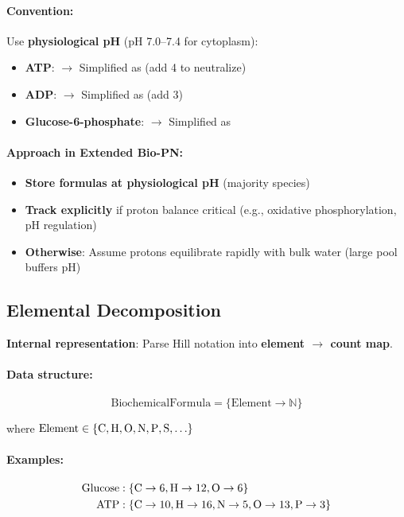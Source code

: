 \paragraph{Convention:} Use \textbf{physiological pH} (pH 7.0--7.4 for cytoplasm):
\begin{itemize}
    \item \textbf{ATP}:  $\to$ Simplified as  (add 4 to neutralize)
    \item \textbf{ADP}:  $\to$ Simplified as  (add 3)
    \item \textbf{Glucose-6-phosphate}:  $\to$ Simplified as 
\end{itemize}

\paragraph{Approach in Extended Bio-PN:}
\begin{itemize}
    \item \textbf{Store formulas at physiological pH} (majority species)
    \item \textbf{Track  explicitly} if proton balance critical (e.g., oxidative phosphorylation, pH regulation)
    \item \textbf{Otherwise}: Assume protons equilibrate rapidly with bulk water (large  pool buffers pH)
\end{itemize}

\subsection{Elemental Decomposition}
\label{subsec:elemental-decomposition}

\textbf{Internal representation}: Parse Hill notation into \textbf{element $\to$ count map}.

\paragraph{Data structure:}
\begin{equation}
\text{BiochemicalFormula} = \{\text{Element} \to \mathbb{N}\}
\end{equation}

where $\text{Element} \in \{\ce{C}, \ce{H}, \ce{O}, \ce{N}, \ce{P}, \ce{S}, \ldots\}$

\paragraph{Examples:}
\begin{align}
\text{Glucose} &: \{\ce{C} \to 6, \ce{H} \to 12, \ce{O} \to 6\} \\
\text{ATP} &: \{\ce{C} \to 10, \ce{H} \to 16, \ce{N} \to 5, \ce{O} \to 13, \ce{P} \to 3\}
\end{align}


